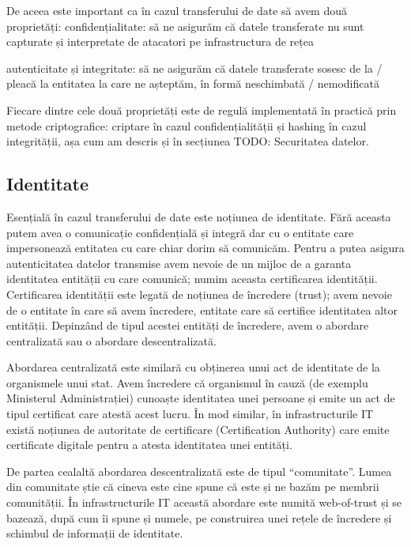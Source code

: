 De aceea este important ca în cazul transferului de date să avem două proprietăți:
confidențialitate: să ne asigurăm că datele transferate nu sunt capturate și interpretate de atacatori pe infrastructura de rețea

autenticitate și integritate: să ne asigurăm că datele transferate sosesc de la / pleacă la entitatea la care ne așteptăm, în formă neschimbată / nemodificată

Fiecare dintre cele două proprietăți este de regulă implementată în practică prin metode criptografice: criptare în cazul confidențialității și hashing în cazul integrității, așa cum am descris și în secțiunea TODO: Securitatea datelor.

\subsection{Identitate}
\label{sec:sec:identity}

Esențială în cazul transferului de date este noțiunea de identitate. Fără aceasta putem avea o comunicație confidențială și integră dar cu o entitate care impersonează entitatea cu care chiar dorim să comunicăm. Pentru a putea asigura autenticitatea datelor transmise avem nevoie de un mijloc de a garanta identitatea entității cu care comunică; numim aceasta certificarea identității. Certificarea identității este legată de noțiunea de încredere (trust); avem nevoie de o entitate în care să avem încredere, entitate care să certifice identitatea altor entității. Depinzând de tipul acestei entități de încredere, avem o abordare centralizată sau o abordare descentralizată.

Abordarea centralizată este similară cu obținerea unui act de identitate de la organismele unui stat. Avem încredere că organismul în cauză (de exemplu Ministerul Administrației) cunoaște identitatea unei persoane și emite un act de tipul certificat care atestă acest lucru. În mod similar, în infrastructurile IT există noțiunea de autoritate de certificare (Certification Authority) care emite certificate digitale pentru a atesta identitatea unei entități.

De partea cealaltă abordarea descentralizată este de tipul “comunitate”. Lumea din comunitate știe că cineva este cine spune că este și ne bazăm pe membrii comunității. În infrastructurile IT această abordare este numită web-of-trust și se bazează, după cum îi spune și numele, pe construirea unei rețele de încredere și schimbul de informații de identitate.

